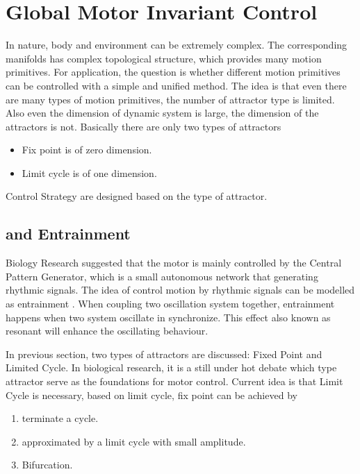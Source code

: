 \section{Global Motor Invariant Control}

In nature, body and environment can be extremely complex. 
The corresponding manifolds has complex topological structure, which provides many motion primitives.
For \cms application, the question is whether different motion primitives can be controlled with a simple and unified method.
The idea is that even there are many types of motion primitives, the number of attractor type is limited. 
Also even the dimension of dynamic system is large, the dimension of the attractors is not. 
Basically there are only two types of attractors
\begin{itemize}
\item Fix point is of zero dimension. 
\item Limit cycle is of one dimension.
\end{itemize}

Control Strategy are designed based on the type of attractor.


\subsection{\cpg and Entrainment}
Biology Research suggested that the motor is mainly controlled by the Central Pattern Generator, which is a small autonomous network that generating rhythmic signals.
The idea of control motion by rhythmic signals can be modelled as entrainment \citep{Gonz'alez-Miranda2004}.
When coupling two oscillation system together, entrainment happens when two system oscillate in synchronize. 
This effect also known as resonant will enhance the oscillating behaviour. 




In previous section, two types of attractors are discussed: Fixed Point and Limited Cycle. 
In biological research, it is a still under hot debate which type attractor serve as the foundations for motor control\citep{Degallier2010}.
Current idea is that Limit Cycle is necessary, based on limit cycle, fix point can be achieved by
\begin{enumerate} 
\item terminate a cycle. 
\item approximated by a limit cycle with small amplitude.
\item Bifurcation. 
\end{enumerate}


